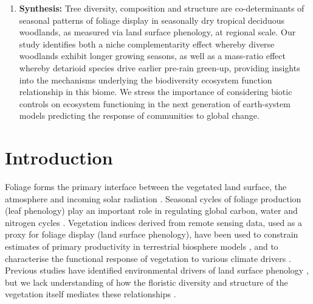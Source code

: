 \documentclass[11pt,a4paper]{article}
\begin{document}
\begin{enumerate}
	\item{\textbf{Synthesis:} Tree diversity, composition and structure are
			co-determinants of seasonal patterns of foliage display in
			seasonally dry tropical deciduous woodlands, as measured via land
			surface phenology, at regional scale. Our study identifies both a
			niche complementarity effect whereby diverse woodlands exhibit
			longer growing seasons, as well as a mass-ratio effect whereby
			detarioid species drive earlier pre-rain green-up, providing
			insights into the mechanisms underlying the biodiversity ecosystem
			function relationship in this biome. We stress the importance of
			considering biotic controls on ecosystem functioning in the next
			generation of earth-system models predicting the response of
		    communities to global change.}

\end{enumerate}

\newpage{}

\section{Introduction}

Foliage forms the primary interface between the vegetated land surface, the
atmosphere and incoming solar radiation \citep{Gu2003, Penuelas2009}. Seasonal
cycles of foliage production (leaf phenology) play an important role in
regulating global carbon, water and nitrogen cycles \citep{Garonna2016}.
Vegetation indices derived from remote sensing data, used as a proxy for
foliage display (land surface phenology), have been used to constrain estimates
of primary productivity in terrestrial biosphere models \citep{Bloom2016,
Helman2018}, and to characterise the functional response of vegetation to
various climate drivers \citep{Richardson2013}. Previous studies have
identified environmental drivers of land surface phenology \citep{Adole2019,
Guan2014}, but we lack understanding of how the floristic diversity and
structure of the vegetation itself mediates these relationships
\citep{Whitley2017, Pau2011}. 
\end{document}
